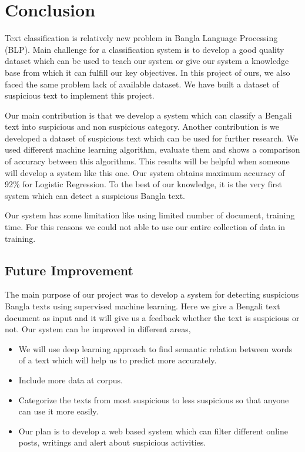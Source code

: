 \chapter{Conclusion}
\thispagestyle{empty}

Text classification is relatively new problem in Bangla Language Processing (BLP). Main challenge for a classification system is to develop a good quality dataset which can be used to teach our system or give our system a knowledge base from which it can fulfill our key objectives. In this project of ours, we also faced the same problem lack of available dataset. We have built a dataset of suspicious text to implement this project.\par \vspace{0.5cm}
Our main contribution is that we develop a system which can classify a Bengali text into suspicious and non suspicious category. Another contribution is we developed a dataset of suspicious text which can be used for further research. We used different machine learning algorithm, evaluate them and shows a comparison of accuracy between this algorithms. This results will be helpful when someone will develop a system like this one. Our system obtains maximum accuracy of 92\% for Logistic Regression. To the best of our knowledge, it is the very first system which can detect a suspicious Bangla text.
\par \vspace{0.5cm}
Our system has some limitation like using limited number of document, training time. For this reasons we could not able to use our entire collection of data in training.
\section{Future Improvement}
The main purpose of our project was to develop a system for detecting suspicious Bangla texts using supervised machine learning. Here we give a Bengali text document as input and it will give us a feedback whether the text is suspicious or not. Our system can be improved in different areas,\\
\begin{itemize}
    \item We will use deep learning approach to find semantic relation between words of a text which will help us to predict more accurately.
    \item Include more data at corpus.
    \item Categorize the texts from most suspicious to less suspicious so that anyone can use it more easily.
    \item Our plan is to develop a web based system which can filter different online posts, writings and alert about suspicious activities.
\end{itemize}